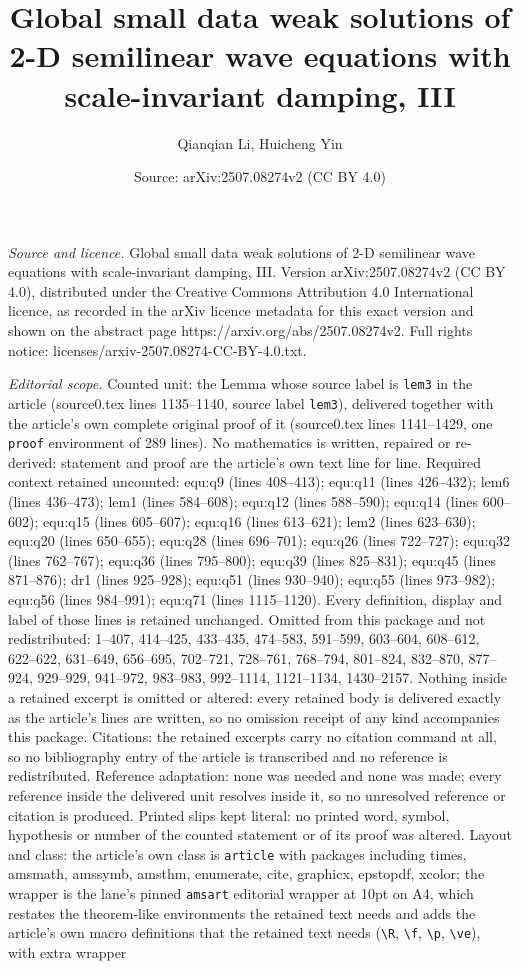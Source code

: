 \documentclass[10pt,a4paper]{amsart}
\title[Global small data weak solutions of 2-D semilinear wave equa]{Global small data weak solutions of 2-D semilinear wave equations with scale-invariant damping, III}
\author{Qianqian Li, Huicheng Yin}
\date{Source: arXiv:2507.08274v2 (CC BY 4.0)}
\begin{document}
\maketitle

\noindent\emph{Source and licence.} Global small data weak solutions of 2-D semilinear wave equations with scale-invariant damping, III. Version arXiv:2507.08274v2 (CC BY 4.0), distributed under the Creative Commons Attribution 4.0 International licence, as recorded in the arXiv licence metadata for this exact version and shown on the abstract page https://arxiv.org/abs/2507.08274v2. Full rights notice: licenses/arxiv-2507.08274-CC-BY-4.0.txt.\par\smallskip

\noindent\textit{Editorial scope.} Counted unit: the Lemma whose source label is \texttt{lem3} in the article (source0.tex lines 1135--1140, source label \texttt{lem3}), delivered together with the article's own complete original proof of it (source0.tex lines 1141--1429, one \texttt{proof} environment of 289 lines). No mathematics is written, repaired or re-derived: statement and proof are the article's own text line for line. Required context retained uncounted: equ:q9 (lines 408--413); equ:q11 (lines 426--432); lem6 (lines 436--473); lem1 (lines 584--608); equ:q12 (lines 588--590); equ:q14 (lines 600--602); equ:q15 (lines 605--607); equ:q16 (lines 613--621); lem2 (lines 623--630); equ:q20 (lines 650--655); equ:q28 (lines 696--701); equ:q26 (lines 722--727); equ:q32 (lines 762--767); equ:q36 (lines 795--800); equ:q39 (lines 825--831); equ:q45 (lines 871--876); dr1 (lines 925--928); equ:q51 (lines 930--940); equ:q55 (lines 973--982); equ:q56 (lines 984--991); equ:q71 (lines 1115--1120). Every definition, display and label of those lines is retained unchanged. Omitted from this package and not redistributed: 1--407, 414--425, 433--435, 474--583, 591--599, 603--604, 608--612, 622--622, 631--649, 656--695, 702--721, 728--761, 768--794, 801--824, 832--870, 877--924, 929--929, 941--972, 983--983, 992--1114, 1121--1134, 1430--2157. Nothing inside a retained excerpt is omitted or altered: every retained body is delivered exactly as the article's lines are written, so no omission receipt of any kind accompanies this package. Citations: the retained excerpts carry no citation command at all, so no bibliography entry of the article is transcribed and no reference is redistributed. Reference adaptation: none was needed and none was made; every reference inside the delivered unit resolves inside it, so no unresolved reference or citation is produced. Printed slips kept literal: no printed word, symbol, hypothesis or number of the counted statement or of its proof was altered. Layout and class: the article's own class is \texttt{article} with packages including times, amsmath, amssymb, amsthm, enumerate, cite, graphicx, epstopdf, xcolor; the wrapper is the lane's pinned \texttt{amsart} editorial wrapper at 10pt on A4, which restates the theorem-like environments the retained text needs and adds the article's own macro definitions that the retained text needs (\texttt{\textbackslash R}, \texttt{\textbackslash f}, \texttt{\textbackslash p}, \texttt{\textbackslash ve}), with extra wrapper 
\end{document}
